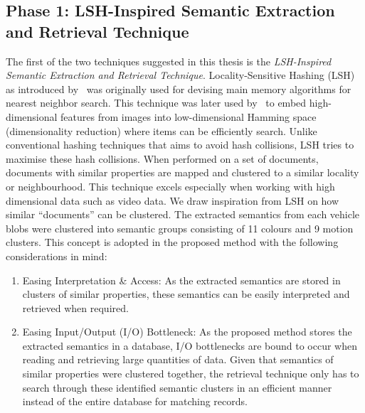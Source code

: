 \subsection{Phase 1: LSH-Inspired Semantic Extraction and Retrieval Technique}
\label{subsec:lsh-intro}
The first of the two techniques suggested in this thesis is the \textit{LSH-Inspired Semantic Extraction and Retrieval Technique}. Locality-Sensitive Hashing (LSH) as introduced by~ was originally used for devising main memory algorithms for nearest neighbor search. This technique was later used by~ to embed high-dimensional features from images into low-dimensional Hamming space (dimensionality reduction) where items can be efficiently search. 
Unlike conventional hashing techniques that aims to avoid hash collisions, LSH tries to maximise these hash collisions. When performed on a set of documents, documents with similar properties are mapped and clustered to a similar locality or neighbourhood. This technique excels especially when working with high dimensional data such as video data.
We draw inspiration from LSH on how similar ``documents'' can be clustered. %
The extracted semantics from each vehicle blobs were clustered into semantic groups consisting of 11 colours and 9 motion clusters. This concept is adopted in the proposed method with the following considerations in mind:
\begin{enumerate}
    \item Easing Interpretation \& Access: As the extracted semantics are stored in clusters of similar properties, these semantics can be easily interpreted and retrieved when required.
    \item Easing Input/Output (I/O) Bottleneck: As the proposed method stores the extracted semantics in a database, I/O bottlenecks are bound to occur when reading and retrieving large quantities of data. Given that semantics of similar properties were clustered together, the retrieval technique only has to search through these identified semantic clusters in an efficient manner instead of the entire database for matching records.
\end{enumerate}


